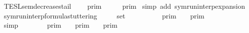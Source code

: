 \begin{isabellebody}
{\isafoldproof}%
%
\isadelimproof
\isanewline
%
\endisadelimproof
\isanewline
{}\isamarkupfalse%
\ TESL{\isacharunderscore}sem{\isacharunderscore}decreases{\isacharunderscore}tail{\isacharcolon}\isanewline
\ \ {\isacartoucheopen}{\isasymlbrakk}{\isasymlbrakk}\ {\isasymGamma}\ {\isasymrbrakk}{\isasymrbrakk}\isactrlsub p\isactrlsub r\isactrlsub i\isactrlsub m\ {\isasymsupseteq}\ {\isasymlbrakk}{\isasymlbrakk}\ {\isasymGamma}\ {\isacharat}\ {\isacharbrackleft}{\isasymgamma}{\isacharbrackright}\ {\isasymrbrakk}{\isasymrbrakk}\isactrlsub p\isactrlsub r\isactrlsub i\isactrlsub m{\isacartoucheclose}\isanewline
%
\isadelimproof
%
\endisadelimproof
%
\isatagproof
{}\isamarkupfalse%
\ {\isacharparenleft}simp\ add{\isacharcolon}\ symrun{\isacharunderscore}interp{\isacharunderscore}expansion{\isacharparenright}%
\endisatagproof
{\isafoldproof}%
%
\isadelimproof
\isanewline
%
\endisadelimproof
\isanewline
{}\isamarkupfalse%
\ symrun{\isacharunderscore}interp{\isacharunderscore}formula{\isacharunderscore}stuttering{\isacharcolon}\isanewline
\ \ \ {\isacartoucheopen}{\isasymgamma}\ {\isasymin}\ set\ {\isasymGamma}{\isacartoucheclose}\isanewline
\ \ \ \ \ {\isacartoucheopen}{\isasymlbrakk}{\isasymlbrakk}\ {\isasymgamma}\ {\isacharhash}\ {\isasymGamma}\ {\isasymrbrakk}{\isasymrbrakk}\isactrlsub p\isactrlsub r\isactrlsub i\isactrlsub m\ {\isacharequal}\ {\isasymlbrakk}{\isasymlbrakk}\ {\isasymGamma}\ {\isasymrbrakk}{\isasymrbrakk}\isactrlsub p\isactrlsub r\isactrlsub i\isactrlsub m{\isacartoucheclose}\isanewline
%
\isadelimproof
%
\endisadelimproof
%
\isatagproof
{}\isamarkupfalse%
\ {\isacharminus}\isanewline
\ \ \isamarkupfalse%
\ {\isacartoucheopen}{\isasymgamma}\ {\isacharhash}\ {\isasymGamma}\ {\isacharequal}\ {\isacharbrackleft}{\isasymgamma}{\isacharbrackright}\ {\isacharat}\ {\isasymGamma}{\isacartoucheclose}\ \isamarkupfalse%
\ simp\isanewline
\ \ \isamarkupfalse%
\ {\isacartoucheopen}{\isasymlbrakk}{\isasymlbrakk}\ {\isasymgamma}\ {\isacharhash}\ {\isasymGamma}\ {\isasymrbrakk}{\isasymrbrakk}\isactrlsub p\isactrlsub r\isactrlsub i\isactrlsub m\ {\isacharequal}\ {\isasymlbrakk}{\isasymlbrakk}\ {\isacharbrackleft}{\isasymgamma}{\isacharbrackright}\ {\isasymrbrakk}{\isasymrbrakk}\isactrlsub p\isactrlsub r\isactrlsub i\isactrlsub m\ {\isasyminter}\ {\isasymlbrakk}{\isasymlbrakk}\ {\isasymGamma}\ {\isasymrbrakk}{\isasymrbrakk}\isactrlsub p\isactrlsub r\isactrlsub i\isactrlsub m{\isacartoucheclose}\ \isamarkupfalse%

\end{isabellebody}
